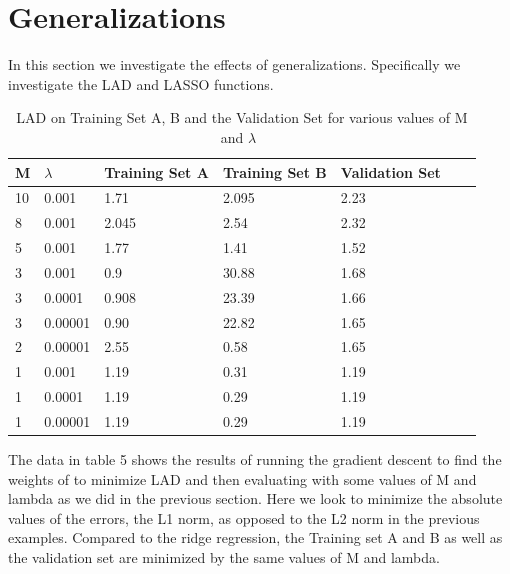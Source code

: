 \documentclass[pageno]{jpaper}
\begin{document}
\section{Generalizations}
In this section we investigate the effects of generalizations. Specifically we investigate the LAD and LASSO functions.
\begin{table}[h!]
  \centering
  \begin{tabular}{llllll|l}
    \hline
    \textbf{M} & \textbf{$\lambda$\ }  & \textbf{Training Set A}  & \textbf{Training Set B} & \textbf{Validation Set} \\
    \hline
 10 	&0.001 &1.71 &2.095 &2.23\\
     \hline
 8 	&0.001 & 2.045 &2.54 & 2.32\\
    \hline
 5 	&0.001 &1.77 & 1.41 & 1.52\\
 \hline
  3 	&0.001 &0.9 & 30.88 & 1.68\\
   \hline
  3 	&0.0001 &0.908 &23.39 & 1.66\\
 \hline
  3 	&0.00001 &0.90 & 22.82 & 1.65\\
    \hline
  2 	&0.00001 &2.55 & 0.58 & 1.65\\
 \hline
 1 	&0.001 &1.19 &0.31 & 1.19\\
  \hline
 1 	&0.0001 &1.19 &0.29 & 1.19\\
\hline
 1 	&0.00001 &1.19 &0.29 & 1.19\\
\hline
 \end{tabular}
  \caption{LAD on Training Set A, B and the Validation Set for various values of M and $\lambda$\   }
  \label{table:formatting}
\end{table}

The data in table 5 shows the results of running the gradient descent to find the weights of to minimize LAD and then evaluating with some values of M and lambda as we did in the previous section. Here we look to minimize the absolute values of the errors, the L1 norm, as opposed to the L2 norm in the previous examples. Compared to the ridge regression, the Training set A and B as well as the validation set are minimized by the same values of M and lambda.
\end{document}
